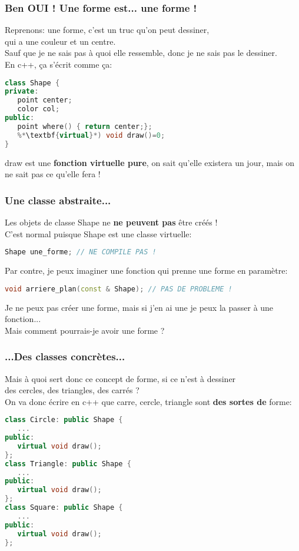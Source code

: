 \documentclass{beamer}
\begin{document}
\begin{frame}[fragile=singleslide,shrink=20]
\frametitle{Ben OUI ! Une forme est... une forme !}
Reprenons: une forme, c'est un truc qu'on peut dessiner, \\ qui a une couleur et un centre. \\
Sauf que je ne sais pas à quoi elle ressemble, donc je ne sais pas le dessiner. \\
En c++, ça s'écrit comme ça:

\begin{lstlisting}[language=c++]
class Shape {
private:
   point center;
   color col;
public:
   point where() { return center;};
   %*\textbf{virtual}*) void draw()=0;
}
\end{lstlisting}
draw est une \textbf{fonction virtuelle pure}, on sait qu'elle existera un jour, mais on ne sait pas ce qu'elle fera !
\end{frame}

\begin{frame}[fragile=singleslide,shrink=20]
\frametitle{Une classe abstraite...}
Les objets de classe Shape ne \textbf{ne peuvent pas} être créés ! \\
C'est normal puisque Shape est une classe virtuelle: 
\begin{lstlisting}[language=c++]
Shape une_forme; // NE COMPILE PAS !
\end{lstlisting}

Par contre, je peux imaginer une fonction qui prenne une forme en paramètre:
\begin{lstlisting}[language=c++]
void arriere_plan(const & Shape); // PAS DE PROBLEME !
\end{lstlisting}
Je ne peux pas créer une forme, mais si j'en ai une je peux la passer à une fonction... \\
Mais comment pourrais-je avoir une forme ?
\end{frame}

\begin{frame}[fragile=singleslide,shrink=20]
\frametitle{...Des classes concrètes...}
Mais à quoi sert donc ce concept de forme, si ce n'est à dessiner \\ 
des cercles, des triangles, des carrés ? \\
On va donc écrire en c++ que carre, cercle, triangle sont \textbf{des sortes de} forme:

\begin{lstlisting}[language=c++]
class Circle: public Shape {
   ...
public:
   virtual void draw();
};
class Triangle: public Shape {
   ...
public:
   virtual void draw();
};
class Square: public Shape {
   ...
public:
   virtual void draw();
};
\end{lstlisting}
\end{frame}
\end{document}
